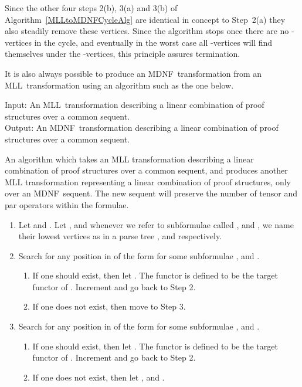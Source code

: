 \documentclass{LMCS}
\theoremstyle{plain}\newtheorem*{cLm}{Claim}
\newcommand{\mll}{MLL} \newcommand{\mall}{MALL}
\newcommand{\p}{} \newcommand{\N}{\mathbb{N}}
\begin{document}
    \p Since the other four steps 2(b), 3(a) and 3(b) of Algorithm~\ref{MLLtoMDNFCycleAlg} are identical in concept to Step~2(a) they also steadily remove these vertices. Since the algorithm stops once there are no -vertices in the cycle, and eventually in the worst case all -vertices will find themselves under the -vertices, this principle assures termination.
    
    \p It is also always possible to produce an MDNF~transformation from an \mll\ transformation using an algorithm such as the one below.
    
    \begin{algo} \label{MDNFAlg}
    Input: An \mll~transformation  describing a linear combination of proof structures over a common sequent. \\
    Output: An MDNF~transformation  describing a linear combination of proof structures over a common sequent.
    
    \p An algorithm which takes an MLL transformation describing a linear combination of proof structures over a common sequent, and produces another MLL transformation representing a linear combination of proof structures, only over an MDNF~sequent. The new sequent will preserve the number of tensor and par operators within the formulae.
    \end{algo}
    \begin{enumerate}
    \item Let  and . Let , and whenever we refer to subformulae called ,  and , we name their lowest vertices as in a parse tree ,  and  respectively.
    
    \item Search for any position in  of the form  for some subformulae ,  and .
    	\begin{enumerate}
    	\item If one should exist, then let . The functor  is defined to be the target functor of . Increment  and go back to Step 2.
    	\item If one does not exist, then move to Step 3.
    	\end{enumerate}
    	
    \item Search for any position in  of the form  for some subformulae ,  and .
    	\begin{enumerate}
    	\item If one should exist, then let . The functor  is defined to be the target functor of . Increment  and go back to Step 2.
    	\item If one does not exist, then let ,  and .
    	\end{enumerate}
    \end{enumerate}
    
\end{document}
